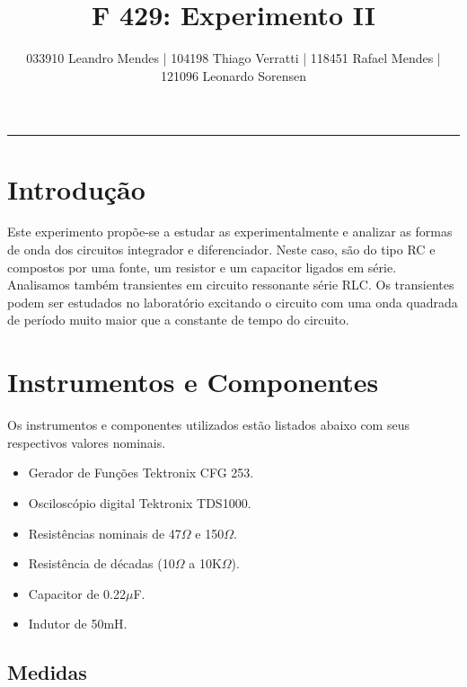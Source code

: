 \documentclass[12pt,letterpaper]{article}
\title{F 429: Experimento II}
\author{033910 Leandro Mendes | 104198 Thiago Verratti | 118451 Rafael Mendes | 121096 Leonardo Sorensen}
\makeatletter
\def\thickhrulefill{\leavevmode \leaders \hrule height 1pt\hfill \kern \z@}
\renewcommand{\maketitle}{
	\begingroup
		\parindent \z@
		\begin{center}
			{\normalsize \@author\par}%
			\thickhrulefill\par
			{\small\raggedleft \@date\par}%
			{\Large\raggedright \@title\par}%
		\end{center}%
	\endgroup
}
\makeatother
\begin{document}
\maketitle
\tableofcontents
\listoffigures
\listoftables
\newpage
\section{Introdução}
Este experimento propõe-se a estudar as experimentalmente e analizar as formas de onda dos circuitos integrador e
diferenciador. Neste caso, são do tipo RC e compostos por uma fonte, um resistor e um
capacitor ligados em série.\\
Analisamos também transientes em circuito ressonante série RLC. Os transientes podem ser estudados no laboratório excitando o circuito com uma onda quadrada de período muito maior que a constante de tempo do circuito.
\section{Instrumentos e Componentes}
Os instrumentos e componentes utilizados estão listados abaixo com seus respectivos valores nominais.
\begin{itemize}
\item{Gerador de Funções Tektronix CFG 253.} 
\item{Osciloscópio digital Tektronix TDS1000.}
\item{Resistências nominais de 47$\Omega$ e 150$\Omega$.}
\item{Resistência de décadas (10$\Omega$ a 10K$\Omega$).}
\item{Capacitor de 0.22$\mu$F.}
\item{Indutor de 50mH.}
\end{itemize}
\subsection{Medidas}
\end{document}
